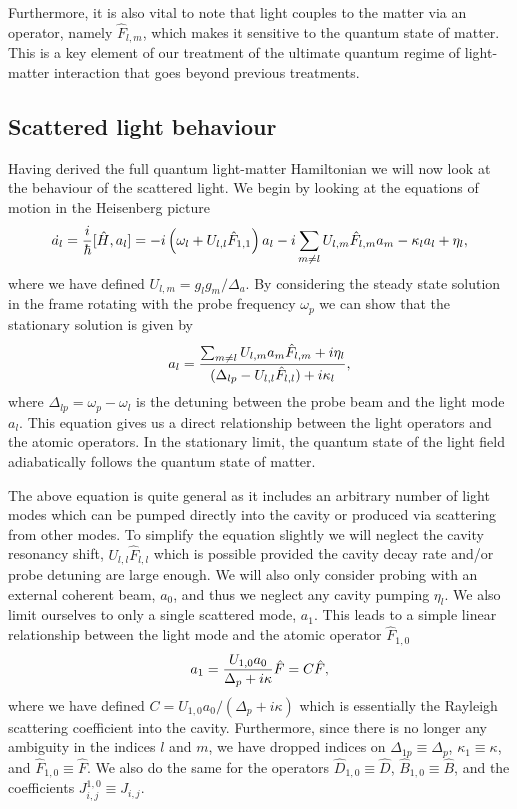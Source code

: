 Furthermore, it is also vital to note that light couples to the matter
via an operator, namely $\hat{F}_{l,m}$, which makes it sensitive to
the quantum state of matter. This is a key element of our treatment of
the ultimate quantum regime of light-matter interaction that goes
beyond previous treatments.

\subsection{Scattered light behaviour}
\label{sec:a}

Having derived the full quantum light-matter Hamiltonian we will now
look at the behaviour of the scattered light. We begin by looking at
the equations of motion in the Heisenberg picture
\begin{equation}
  \dot{a_l} = \frac{i}{\hbar} [\hat{H}, a_l] = 
  -i \left(\omega_l + U_{l,l}\hat{F}_{1,1} \right) a_l
   - i \sum_{m \ne l} U_{l,m} \hat{F}_{l,m} a_m
    - \kappa_l a_l + \eta_l,
\end{equation}
where we have defined $U_{l,m} = g_l g_m / \Delta_a$. By considering
the steady state solution in the frame rotating with the probe
frequency $\omega_p$ we can show that the stationary solution is given
by
\begin{equation}
  a_l = \frac{\sum_{m \ne l} U_{l,m} a_m \hat{F}_{l,m} + i \eta_l} 
  {(\Delta_{lp} - U_{l,l} \hat{F}_{l,l}) + i \kappa_l},
\end{equation}
where $\Delta_{lp} = \omega_p - \omega_l$ is the detuning between the
probe beam and the light mode $a_l$. This equation gives us a direct
relationship between the light operators and the atomic operators. In
the stationary limit, the quantum state of the light field
adiabatically follows the quantum state of matter.

The above equation is quite general as it includes an arbitrary number
of light modes which can be pumped directly into the cavity or
produced via scattering from other modes. To simplify the equation
slightly we will neglect the cavity resonancy shift, $U_{l,l}
\hat{F}_{l,l}$ which is possible provided the cavity decay rate and/or
probe detuning are large enough. We will also only consider probing
with an external coherent beam, $a_0$, and thus we neglect any cavity
pumping $\eta_l$. We also limit ourselves to only a single scattered
mode, $a_1$. This leads to a simple linear relationship between the
light mode and the atomic operator $\hat{F}_{1,0}$
\begin{equation}
  \label{eq:a}
  a_1 = \frac{U_{1,0} a_0} {\Delta_{p} + i \kappa} \hat{F} =
  C \hat{F},
\end{equation}
where we have defined $C = U_{1,0} a_0 / (\Delta_{p} + i \kappa)$
which is essentially the Rayleigh scattering coefficient into the
cavity. Furthermore, since there is no longer any ambiguity in the
indices $l$ and $m$, we have dropped indices on $\Delta_{1p} \equiv
\Delta_p$, $\kappa_1 \equiv \kappa$, and $\hat{F}_{1,0} \equiv
\hat{F}$. We also do the same for the operators $\hat{D}_{1,0} \equiv
\hat{D}$, $\hat{B}_{1,0} \equiv \hat{B}$, and the coefficients
$J^{1,0}_{i,j} \equiv J_{i,j}$.

